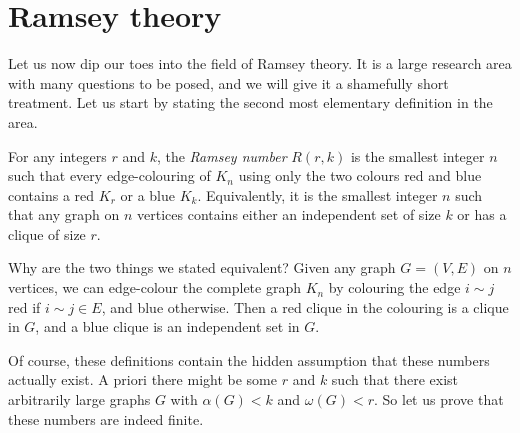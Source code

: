 \documentclass[nobib]{tufte-handout}
\begin{document}
\section{Ramsey theory}

Let us now dip our toes into the field of Ramsey theory. It is a large research area with many questions to be posed, and we will give it a shamefully short treatment. Let us start by stating the second most elementary definition in the area.

\begin{definition}
  For any integers $r$ and $k$, the \emph{Ramsey number} $R(r,k)$ is the smallest integer $n$ such that every edge-colouring of $K_n$ using only the two colours red and blue contains a red $K_r$ or a blue $K_k$. Equivalently, it is the smallest integer $n$ such that any graph on $n$ vertices contains either an independent set of size $k$ or has a clique of size $r$.
\end{definition}

\begin{remark}
  Why are the two things we stated equivalent? Given any graph $G = (V,E)$ on $n$ vertices, we can edge-colour the complete graph $K_n$ by colouring the edge $i \sim j$ red if $i \sim j \in E$, and blue otherwise. Then a red clique in the colouring is a clique in $G$, and a blue clique is an independent set in $G$.
\end{remark}

Of course, these definitions contain the hidden assumption that these numbers actually exist. A priori there might be some $r$ and $k$ such that there exist arbitrarily large graphs $G$ with $\alpha(G) < k$ and $\omega(G) < r$. So let us prove that these numbers are indeed finite.
\end{document}
